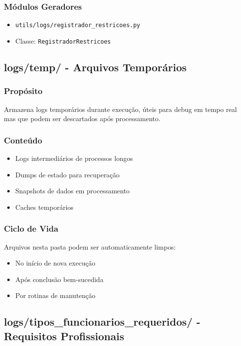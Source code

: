 \documentclass[11pt,a4paper]{article}
\begin{document}
\subsubsection{Módulos Geradores}

\begin{itemize}
    \item \texttt{utils/logs/registrador\_restricoes.py}
    \item Classe: \texttt{RegistradorRestricoes}
\end{itemize}

\subsection{logs/temp/ - Arquivos Temporários}

\subsubsection{Propósito}

Armazena logs temporários durante execução, úteis para debug em tempo real mas que podem ser descartados após processamento.

\subsubsection{Conteúdo}

\begin{itemize}
    \item Logs intermediários de processos longos
    \item Dumps de estado para recuperação
    \item Snapshots de dados em processamento
    \item Caches temporários
\end{itemize}

\subsubsection{Ciclo de Vida}

Arquivos nesta pasta podem ser automaticamente limpos:
\begin{itemize}
    \item No início de nova execução
    \item Após conclusão bem-sucedida
    \item Por rotinas de manutenção
\end{itemize}

\subsection{logs/tipos\_funcionarios\_requeridos/ - Requisitos Profissionais}
\end{document}
